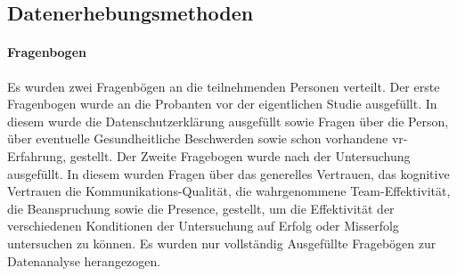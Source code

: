\documentclass[a4paper,11pt]{article}%
\renewcommand{\\}{\vspace*{0.5\baselineskip} \newline}
\begin{document}
%
%			
%	

	\subsection{Datenerhebungsmethoden}
	
				\paragraph{Fragenbogen}
Es wurden zwei Fragenbögen an die teilnehmenden Personen verteilt. Der erste Fragenbogen wurde an die Probanten vor der eigentlichen Studie ausgefüllt. In diesem wurde die Datenschutzerklärung ausgefüllt sowie Fragen über die \dq{}Person\dq{}, über eventuelle \dq{}Gesundheitliche Beschwerden\dq{} sowie schon vorhandene \dq{}\ac{vr}-Erfahrung\dq{}, gestellt. Der Zweite Fragebogen wurde nach der Untersuchung ausgefüllt. In diesem wurden Fragen über das \dq{}generelles Vertrauen\dq{}, das \dq{}kognitive Vertrauen\dq{} die \dq{}Kommunikations-Qualität\dq{}, die wahrgenommene \dq{}Team-Effektivität\dq{}, die \dq{}Beanspruchung\dq{} sowie die \dq{}Presence\dq{}, gestellt, um die Effektivität der verschiedenen Konditionen der Untersuchung auf Erfolg oder Misserfolg untersuchen zu können.
				Es wurden nur vollständig Ausgefüllte Fragebögen zur Datenanalyse herangezogen.
\end{document}
